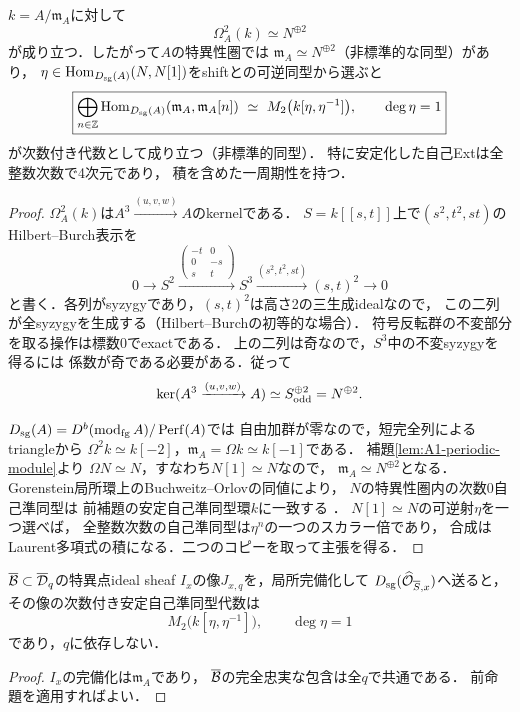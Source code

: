 \begin{proposition}[剰余体の第二syzygyと安定自己準同型代数]
\label{prop:A1-stable-end}
$k=A/\mathfrak m_A$に対して
\[
 \boxed{\Omega_A^2(k)\simeq N^{\oplus2}}
\]
が成り立つ．したがって$A$の特異性圏では
$\mathfrak m_A\simeq N^{\oplus2}$（非標準的な同型）があり，
$\eta\in\operatorname{Hom}_{D_{\rm sg}(A)}(N,N[1])$をshiftとの可逆同型から選ぶと
\[
\boxed{
 \bigoplus_{n\in\mathbb Z}
 \operatorname{Hom}_{D_{\rm sg}(A)}(\mathfrak m_A,\mathfrak m_A[n])
 \ \simeq\ M_2\bigl(k[\eta,\eta^{-1}]\bigr),
 \qquad\deg\eta=1
}
\]
が次数付き代数として成り立つ（非標準的同型）．
特に安定化した自己Extは全整数次数で4次元であり，
積を含めた一周期性を持つ．
\end{proposition}
\begin{proof}
$\Omega_A^2(k)$は$A^3\xrightarrow{(u,v,w)}A$のkernelである．
$S=k[[s,t]]$上で$(s^2,t^2,st)$のHilbert--Burch表示を
\[
 0\longrightarrow S^2
 \xrightarrow{
 \begin{pmatrix}-t&0\\0&-s\\s&t\end{pmatrix}}
 S^3\xrightarrow{(s^2,t^2,st)} (s,t)^2
 \longrightarrow0
\]
と書く．各列がsyzygyであり，$(s,t)^2$は高さ2の三生成idealなので，
この二列が全syzygyを生成する（Hilbert--Burchの初等的な場合）．
符号反転群の不変部分を取る操作は標数0でexactである．
上の二列は奇なので，$S^3$中の不変syzygyを得るには
係数が奇である必要がある．従って
\[
\ker(A^3\xrightarrow{(u,v,w)}A)
 \simeq S_{\rm odd}^{\oplus2}=N^{\oplus2}.
\]

$D_{\rm sg}(A)=D^b(\operatorname{mod}_{\rm fg}A)/\operatorname{Perf}(A)$では
自由加群が零なので，短完全列によるtriangleから
$\Omega^2 k\simeq k[-2]$，$\mathfrak m_A=\Omega k\simeq k[-1]$である．
補題\ref{lem:A1-periodic-module}より
$\Omega N\simeq N$，すなわち$N[1]\simeq N$なので，
$\mathfrak m_A\simeq N^{\oplus2}$となる．
Gorenstein局所環上のBuchweitz--Orlovの同値により，
$N$の特異性圏内の次数0自己準同型は
前補題の安定自己準同型環$k$に一致する
\cite{BuchweitzMCM,OrlovSingularity}．
$N[1]\simeq N$の可逆射$\eta$を一つ選べば，
全整数次数の自己準同型は$\eta^n$の一つのスカラー倍であり，
合成はLaurent多項式の積になる．二つのコピーを取って主張を得る．
\end{proof}

\begin{corollary}[$q$に依存しない局所積模型]\label{cor:A1-local-q-invariant}
$\overline{\mathcal B}\subset\overline{\mathcal D}_q$の特異点ideal sheaf
$I_x$の像$J_{x,q}$を，局所完備化して
$D_{\rm sg}(\widehat{\mathcal O}_{\overline S,x})$へ送ると，
その像の次数付き安定自己準同型代数は
\[
 M_2\bigl(k[\eta,\eta^{-1}]\bigr),\qquad\deg\eta=1
\]
であり，$q$に依存しない．
\end{corollary}
\begin{proof}
$I_x$の完備化は$\mathfrak m_A$であり，
$\overline{\mathcal B}$の完全忠実な包含は全$q$で共通である．
前命題を適用すればよい．
\end{proof}


